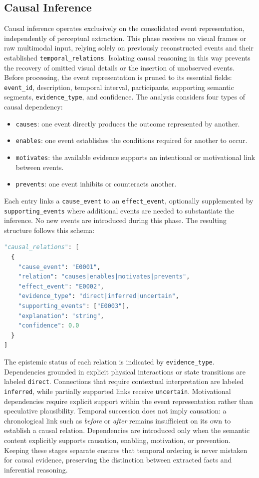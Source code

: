 \subsection*{Causal Inference}
Causal inference operates exclusively on the consolidated event representation, independently of perceptual extraction. This phase receives no visual frames or raw multimodal input, relying solely on previously reconstructed events and their established \texttt{temporal\_relations}.
Isolating causal reasoning in this way prevents the recovery of omitted visual details or the insertion of unobserved events. Before processing, the event representation is pruned to its essential fields: \texttt{event\_id}, description, temporal interval, participants, supporting semantic segments, \texttt{evidence\_type}, and confidence.
The analysis considers four types of causal dependency:
\begin{itemize}
  \item \texttt{causes}: one event directly produces the outcome represented by another.
  \item \texttt{enables}: one event establishes the conditions required for another to occur.
  \item \texttt{motivates}: the available evidence supports an intentional or motivational link between events.
  \item \texttt{prevents}: one event inhibits or counteracts another.
\end{itemize}
Each entry links a \texttt{cause\_event} to an \texttt{effect\_event}, optionally supplemented by \texttt{supporting\_events} where additional events are needed to substantiate the inference. No new events are introduced during this phase.
The resulting structure follows this schema:
\begin{lstlisting}[language=Python]
"causal_relations": [
  {
    "cause_event": "E0001",
    "relation": "causes|enables|motivates|prevents",
    "effect_event": "E0002",
    "evidence_type": "direct|inferred|uncertain",
    "supporting_events": ["E0003"],
    "explanation": "string",
    "confidence": 0.0
  }
]
\end{lstlisting}
The epistemic status of each relation is indicated by \texttt{evidence\_type}. Dependencies grounded in explicit physical interactions or state transitions are labeled \texttt{direct}. Connections that require contextual interpretation are labeled \texttt{inferred}, while partially supported links receive \texttt{uncertain}. Motivational dependencies require explicit support within the event representation rather than speculative plausibility.
Temporal succession does not imply causation: a chronological link such as \textit{before} or \textit{after} remains insufficient on its own to establish a causal relation. Dependencies are introduced only when the semantic content explicitly supports causation, enabling, motivation, or prevention. Keeping these stages separate ensures that temporal ordering is never mistaken for causal evidence, preserving the distinction between extracted facts and inferential reasoning.
